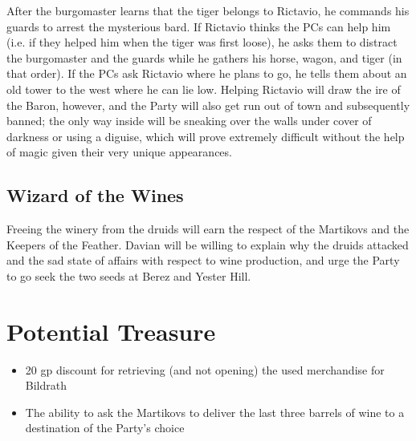 \documentclass[a4paper,11pt]{article}
\begin{document}
After the burgomaster learns that the tiger belongs to Rictavio, he commands his guards to arrest the mysterious 
bard. If Rictavio thinks the PCs can help him (i.e. if they helped him when the tiger was first loose), he asks 
them to distract the burgomaster and the guards while he gathers his horse, wagon, and tiger (in that order). If 
the PCs ask Rictavio where he plans to go, he tells them about an old tower to the west where he can lie low.
Helping Rictavio will draw the ire of the Baron, however, and the Party will also get run out of town and
subsequently banned; the only way inside will be sneaking over the walls under cover of darkness or using a 
diguise, which will prove extremely difficult without the help of magic given their very unique appearances.

\subsection{Wizard of the Wines}
Freeing the winery from the druids will earn the respect of the Martikovs and the Keepers of the Feather. Davian 
will be willing to explain why the druids attacked and the sad state of affairs with respect to wine production, 
and urge the Party to go seek the two seeds at Berez and Yester Hill.

\section{Potential Treasure}
\label{sec:PotentialTreasure}
\begin{itemize}
  \item 20 gp discount for retrieving (and not opening) the used merchandise for Bildrath
  \item The ability to ask the Martikovs to deliver the last three barrels of wine to a destination of the 
  Party's choice
\end{itemize}
\end{document}
